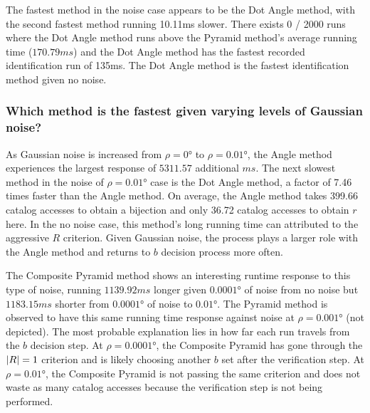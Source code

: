 The fastest method in the noise case appears to be the Dot Angle method, with the second fastest method running
10.11\si{ms} slower.
There exists 0 / 2000 runs where the Dot Angle method runs above the Pyramid method's average running time
($170.79\si{ms}$) and the Dot Angle method has the fastest recorded identification run of 135ms.
The Dot Angle method is the fastest identification method given no noise.

\subsubsection{Which method is the fastest given varying levels of Gaussian noise?}
As Gaussian noise is increased from $\rho=\ang{0}$ to $\rho=\ang{0.01}$, the Angle method experiences the largest
response of $5311.57$ additional $\si{ms}$.
The next slowest method in the noise of $\rho=\ang{0.01}$ case is the Dot Angle method, a factor of 7.46 times faster
than the Angle method.
On average, the Angle method takes 399.66 catalog accesses to obtain a bijection and only 36.72 catalog accesses
to obtain $r$ here.
In the no noise case, this method's long running time can attributed to the aggressive $R$ criterion.
Given Gaussian noise, the  process plays a larger role with the Angle method and returns to $b$
decision process more often.

The Composite Pyramid method shows an interesting runtime response to this type of noise, running $1139.92\si{ms}$
longer given $\ang{0.0001}$ of noise from no noise but $1183.15\si{ms}$ shorter from $\ang{0.0001}$ of noise to
$\ang{0.01}$.
The Pyramid method is observed to have this same running time response against noise at $\rho=\ang{0.001}$
(not depicted).
The most probable explanation lies in how far each run travels from the $b$ decision step.
At $\rho=\ang{0.0001}$, the Composite Pyramid has gone through the $\left| R \right| = 1$ criterion and is likely choosing
another $b$ set after the verification step.
At $\rho=\ang{0.01}$, the Composite Pyramid is not passing the same criterion and does not waste as many catalog
accesses because the verification step is not being performed.

